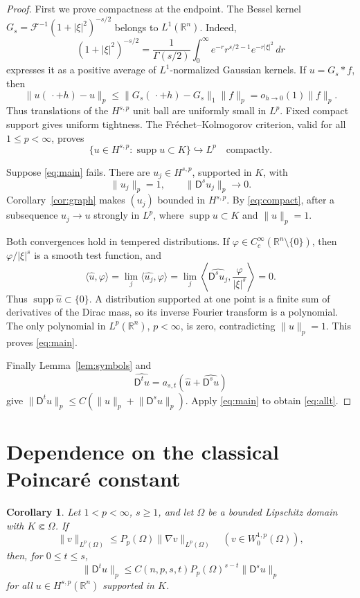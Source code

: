 \documentclass[11pt]{article}
\newtheorem{corollary}[theorem]{Corollary}
\newcommand{\R}{\mathbb R}
\newcommand{\F}{\mathcal F}
\newcommand{\supp}{\operatorname{supp}}
\newcommand{\D}{\mathsf D}
\newcommand{\norm}[1]{\lVert #1\rVert}
\begin{document}
\begin{proof}
First we prove compactness at the endpoint.  The Bessel kernel
\(G_s=\F^{-1}(1+|\xi|^2)^{-s/2}\) belongs to \(L^1(\R^n)\).  Indeed,
\[
 (1+|\xi|^2)^{-s/2}
 =\frac1{\Gamma(s/2)}\int_0^\infty
 e^{-r}r^{s/2-1}e^{-r|\xi|^2}\,dr
\]
expresses it as a positive average of \(L^1\)-normalized Gaussian
kernels.  If \(u=G_s*f\), then
\[
 \norm{u(\,\cdot+h)-u}_p
 \leq\norm{G_s(\,\cdot+h)-G_s}_1\norm f_p
 =o_{h\to0}(1)\norm f_p.
\]
Thus translations of the \(H^{s,p}\) unit ball are uniformly small in
\(L^p\).  Fixed compact support gives uniform tightness.  The
Fr\'echet--Kolmogorov criterion, valid for all \(1\leq p<\infty\), proves
\begin{equation}\label{eq:compact}
 \{u\in H^{s,p}:\supp u\subset K\}\hookrightarrow L^p
 \quad\text{compactly}.
\end{equation}

Suppose \eqref{eq:main} fails.  There are \(u_j\in H^{s,p}\), supported in
\(K\), with
\[
 \norm{u_j}_p=1,\qquad \norm{\D^su_j}_p\longrightarrow0.
\]
Corollary~\ref{cor:graph} makes \((u_j)\) bounded in \(H^{s,p}\).  By
\eqref{eq:compact}, after a subsequence \(u_j\to u\) strongly in \(L^p\),
where \(\supp u\subset K\) and \(\norm u_p=1\).

Both convergences hold in tempered distributions.  If
\(\varphi\in C_c^\infty(\R^n\setminus\{0\})\), then
\(\varphi/|\xi|^s\) is a smooth test function, and
\[
 \langle\widehat u,\varphi\rangle
 =\lim_j\langle\widehat{u_j},\varphi\rangle
 =\lim_j\left\langle
     \widehat{\D^su_j},\frac{\varphi}{|\xi|^s}
   \right\rangle=0.
\]
Thus \(\supp\widehat u\subset\{0\}\).  A distribution supported at one
point is a finite sum of derivatives of the Dirac mass, so its inverse
Fourier transform is a polynomial.  The only polynomial in
\(L^p(\R^n)\), \(p<\infty\), is zero, contradicting \(\norm u_p=1\).
This proves \eqref{eq:main}.

Finally Lemma~\ref{lem:symbols} and
\[
 \widehat{\D^tu}=a_{s,t}(\widehat u+\widehat{\D^su})
\]
give \(\norm{\D^tu}_p\leq C(\norm u_p+\norm{\D^su}_p)\).
Apply \eqref{eq:main} to obtain \eqref{eq:allt}.
\end{proof}

\section*{Dependence on the classical Poincar\'e constant}

\begin{corollary}\label{cor:classical}
Let \(1<p<\infty\), \(s\geq1\), and let \(\Omega\) be a bounded Lipschitz
domain with \(K\Subset\Omega\).  If
\[
 \norm v_{L^p(\Omega)}\leq P_p(\Omega)\norm{\nabla v}_{L^p(\Omega)}
 \quad(v\in W^{1,p}_0(\Omega)),
\]
then, for \(0\leq t\leq s\),
\begin{equation}\label{eq:classical}
 \norm{\D^tu}_p
 \leq C(n,p,s,t)P_p(\Omega)^{s-t}\norm{\D^su}_p
\end{equation}
for all \(u\in H^{s,p}(\R^n)\) supported in \(K\).
\end{corollary}
\end{document}
